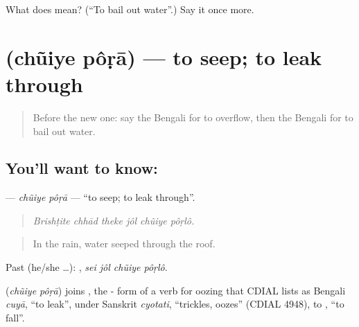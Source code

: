 \begin{tcolorbox}[breakable,colback=teal!4,colframe=teal!35!black,title={Before you move on}]
What does  mean? (\textquotedblleft{}To bail out water\textquotedblright{}.) Say it once more.
\end{tcolorbox}
\section[\texorpdfstring{\bn{চুঁইয়ে} \bn{পড়া} (chũiye pôṛā)}{চুঁইয়ে পড়া (chũiye pôṛā)}]{  (chũiye pôṛā) — to seep; to leak through}

\label{lesson:BN-C506-chuiye-pora}



\begin{quote}
Before the new one: say the Bengali for to overflow, then the Bengali for to bail out water.
\end{quote}

\subsection*{You'll want to know:  }
\textbf{ } — \emph{chũiye pôṛā} — \textquotedblleft{}to seep; to leak through\textquotedblright{}.

\begin{quote}
     
\end{quote}

\begin{quote}
\emph{Brishṭite chhād theke jôl chũiye pôṛlô.}
\end{quote}

\begin{quote}
In the rain, water seeped through the roof.
\end{quote}

Past (he/she …):    , \emph{sei jôl chũiye pôṛlô}.

\begin{cousinweb}
\textbf{ } (\emph{chũiye pôṛā}) joins , the - form of a verb for oozing that CDIAL lists as Bengali \emph{cuyā}, \textquotedblleft{}to leak\textquotedblright{}, under Sanskrit \emph{cyotati}, \textquotedblleft{}trickles, oozes\textquotedblright{} (CDIAL 4948), to , \textquotedblleft{}to fall\textquotedblright{}.
\end{cousinweb}

